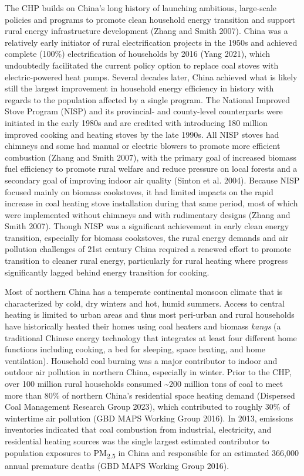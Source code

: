 \documentclass[
  letterpaper,
  DIV=11,
  numbers=noendperiod]{scrartcl}
\begin{document}
The CHP builds on China's long history of launching
ambitious, large-scale policies and programs to promote clean household
energy transition and support rural energy infrastructure development
(Zhang and Smith 2007). China was a relatively early initiator of rural
electrification projects in the 1950s and achieved complete (100\%)
electrification of households by 2016 (Yang 2021), which undoubtedly
facilitated the current policy option to replace coal stoves with
electric-powered heat pumps. Several decades later, China achieved what
is likely still the largest improvement in household energy efficiency
in history with regards to the population affected by a single program.
The National Improved Stove Program (NISP) and its provincial- and
county-level counterparts were initiated in the early 1980s and are
credited with introducing 180 million improved cooking and heating
stoves by the late 1990s. All NISP stoves had chimneys and some had
manual or electric blowers to promote more efficient combustion (Zhang
and Smith 2007), with the primary goal of increased biomass fuel
efficiency to promote rural welfare and reduce pressure on local forests
and a secondary goal of improving indoor air quality (Sinton et al.
2004). Because NISP focused mainly on biomass cookstoves, it had limited
impacts on the rapid increase in coal heating stove installation during
that same period, most of which were implemented without chimneys and
with rudimentary designs (Zhang and Smith 2007). Though NISP was a
significant achievement in early clean energy transition, especially for
biomass cookstoves, the rural energy demands and air pollution
challenges of 21st century China required a renewed effort to promote
transition to cleaner rural energy, particularly for rural heating where
progress significantly lagged behind energy transition for cooking.

Most of northern China has a temperate continental monsoon climate that
is characterized by cold, dry winters and hot, humid summers. Access to
central heating is limited to urban areas and thus most peri-urban and
rural households have historically heated their homes using coal heaters
and biomass \emph{kangs} (a traditional Chinese energy technology that
integrates at least four different home functions including cooking, a
bed for sleeping, space heating, and home ventilation). Household coal
burning was a major contributor to indoor and outdoor air pollution in
northern China, especially in winter. Prior to the CHP, over 100 million
rural households consumed \textasciitilde200 million tons of coal to
meet more than 80\% of northern China's residential space heating demand
(Dispersed Coal Management Research Group 2023), which contributed to
roughly 30\% of wintertime air pollution (GBD MAPS Working Group 2016).
In 2013, emissions inventories indicated that coal combustion from
industrial, electricity, and residential heating sources was the single
largest estimated contributor to population exposures to
PM\textsubscript{2.5} in China and responsible for an estimated 366,000
annual premature deaths (GBD MAPS Working Group 2016).
\end{document}
